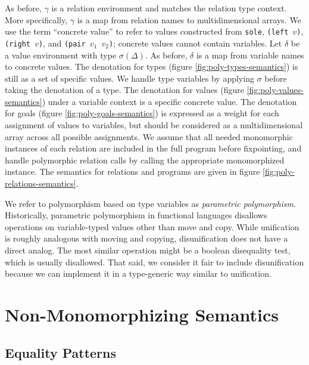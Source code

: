 \documentclass{report}
\theoremstyle{definition}
\begin{document}
As before, \(\gamma\) is a relation environment and matches the relation type context.
More specifically, \(\gamma\) is a map from relation names to multidimensional arrays.
We use the term ``concrete value'' to refer to values constructed from \texttt{sole}, \texttt{(left \(v\))}, \texttt{(right \(v\))}, and \texttt{(pair \(v_1\) \(v_2\))}; concrete values cannot contain variables.
Let \(\delta\) be a value environment with type \(\sigma(\Delta)\).
As before, \(\delta\) is a map from variable names to concrete values.
The denotation for types (figure \ref{fig:poly-types-semantics}) is still as a set of specific values.
We handle type variables by applying \(\sigma\) before taking the denotation of a type.
The denotation for values (figure \ref{fig:poly-values-semantics}) under a variable context is a specific concrete value.
The denotation for goals (figure \ref{fig:poly-goals-semantics}) is expressed as a weight for each assignment of values to variables,
but should be considered as a multidimensional array across all possible assignments.
We assume that all needed monomorphic instances of each relation are included in the full program before fixpointing,
and handle polymorphic relation calls by calling the appropriate monomorphized instance.
The semantics for relations and programs are given in figure \ref{fig:poly-relations-semantics}.

We refer to polymorphism based on type variables as \emph{parametric polymorphism}.
Historically, parametric polymorphism in functional languages disallows operations on variable-typed values other than move and copy.
While unification is roughly analogous with moving and copying, disunification does not have a direct analog.
The most similar operation might be a boolean disequality test, which is usually disallowed.
That said, we consider it fair to include disunification because we can implement it in a type-generic way similar to unification.

\section{Non-Monomorphizing Semantics}

\subsection{Equality Patterns}
\end{document}
